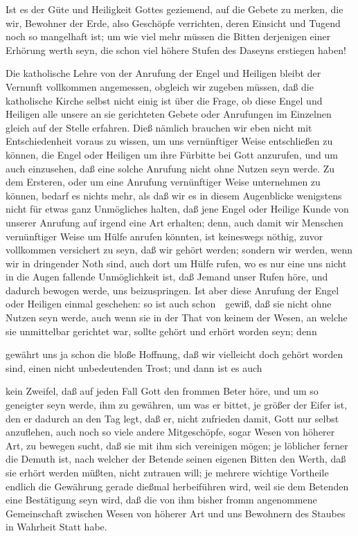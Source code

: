 \begin{aufza}
\item Ist es der Güte und Heiligkeit Gottes geziemend, auf die Gebete zu merken, die wir, Bewohner der Erde, also Geschöpfe verrichten, deren Einsicht und Tugend noch so mangelhaft ist; um wie viel mehr müssen die Bitten derjenigen einer Erhörung werth seyn, die schon viel höhere Stufen des Daseyns erstiegen haben!
\item Die katholische Lehre von der Anrufung der Engel und Heiligen bleibt der Vernunft vollkommen angemessen, obgleich wir zugeben müssen, daß die katholische Kirche selbst nicht einig ist über die Frage, ob diese Engel und Heiligen alle unsere an sie gerichteten Gebete oder Anrufungen im Einzelnen gleich auf der Stelle erfahren. Dieß nämlich brauchen wir eben nicht mit Entschiedenheit voraus zu wissen, um uns vernünftiger Weise entschließen zu können, die Engel oder Heiligen um ihre Fürbitte bei Gott anzurufen, und um auch einzusehen, daß eine solche Anrufung nicht ohne Nutzen seyn werde. Zu dem Ersteren, oder um eine Anrufung vernünftiger Weise unternehmen zu können, bedarf es nichts mehr, als daß wir es in diesem Augenblicke wenigstens nicht für etwas ganz Unmögliches halten, daß jene Engel oder Heilige Kunde von unserer Anrufung auf irgend eine Art erhalten; denn, auch damit wir Menschen vernünftiger Weise um Hülfe anrufen könnten, ist keineswegs nöthig, zuvor vollkommen versichert zu seyn, daß wir gehört werden; sondern wir werden, wenn wir in dringender Noth sind, auch dort um Hülfe rufen, wo es nur eine uns nicht in die Augen fallende Unmöglichkeit ist, daß Jemand unser Rufen höre, und dadurch bewogen werde, uns beizuspringen. Ist aber diese Anrufung der Engel oder Heiligen einmal geschehen: so ist auch schon~\ gewiß, daß sie nicht ohne Nutzen seyn werde, auch wenn sie in der That von keinem der Wesen, an welche sie unmittelbar gerichtet war, sollte gehört und erhört worden seyn; denn
\begin{aufzb}
\item gewährt uns ja schon die bloße Hoffnung, daß wir vielleicht doch gehört worden sind, einen nicht unbedeutenden Trost; und dann ist es auch
\item kein Zweifel, daß auf jeden Fall Gott den frommen Beter höre, und um so geneigter seyn werde, ihm zu gewähren, um was er bittet, je größer der Eifer ist, den er dadurch an den Tag legt, daß er, nicht zufrieden damit, Gott nur selbst anzuflehen, auch noch so viele andere Mitgeschöpfe, sogar Wesen von höherer Art, zu bewegen sucht, daß sie mit ihm sich vereinigen mögen; je löblicher ferner die Demuth ist, nach welcher der Betende seinen eigenen Bitten den Werth, daß sie erhört werden müßten, nicht zutrauen will; je mehrere wichtige Vortheile endlich die Gewährung gerade dießmal herbeiführen wird, weil sie dem Betenden eine Bestätigung seyn wird, daß die von ihm bisher fromm angenommene Gemeinschaft zwischen Wesen von höherer Art und uns Bewohnern des Staubes in Wahrheit Statt habe.

\end{aufzb}
\end{aufza}
